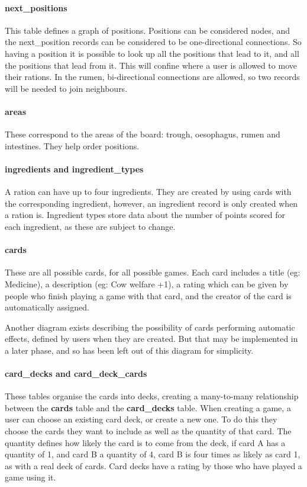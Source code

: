 \paragraph{next\_positions} This table defines a graph of positions. Positions can be considered nodes, and the next\_position records can be considered to be one-directional connections. So having a position it is possible to look up all the positions that lead to it, and all the positions that lead from it. This will confine where a user is allowed to move their rations. In the rumen, bi-directional connections are allowed, so two records will be needed to join neighbours.

\paragraph{areas} These correspond to the areas of the board: trough, oesophagus, rumen and intestines. They help order positions.

\paragraph{ingredients and ingredient\_types} A ration can have up to four ingredients. They are created by using cards with the corresponding ingredient, however, an ingredient record is only created when a ration is. Ingredient types store data about the number of points scored for each ingredient, as these are subject to change.

\paragraph{cards} These are all possible cards, for all possible games. Each card includes a title (eg: Medicine), a description (eg: Cow welfare +1), a rating which can be given by people who finish playing a game with that card, and the creator of the card is automatically assigned.

Another diagram exists describing the possibility of cards performing automatic effects, defined by users when they are created. But that may be implemented in a later phase, and so has been left out of this diagram for simplicity.

\paragraph{card\_decks and card\_deck\_cards} These tables organise the cards into decks, creating a many-to-many relationship between the \textbf{cards} table and the \textbf{card\_decks} table. When creating a game, a user can choose an existing card deck, or create a new one. To do this they choose the cards they want to include as well as the quantity of that card. The quantity defines how likely the card is to come from the deck, if card A has a quantity of 1, and card B a quantity of 4, card B is four times as likely as card 1, as with a real deck of cards. Card decks have a rating by those who have played a game using it.

